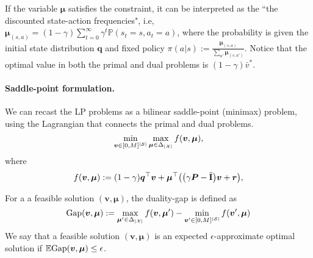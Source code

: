 \documentclass{article}
\DeclarePairedDelimiter\br{(}{)}%
\DeclarePairedDelimiter\brs{[}{]}%
\DeclarePairedDelimiter\abs{\lvert}{\rvert}%
\newcommand{\ntext}[1]{{\text{\normalfont#1}}}
\DeclareMathOperator{\Tr}{Tr}
\newcommand{\Prob}{\mathbb{P}}
\newcommand{\R}{\mathbb{R}}
\newcommand{\E}{\mathbb{E}}
\newcommand{\States}{\mathcal{S}}
\newcommand{\Actions}{\mathcal{A}}
\newcommand{\nSt}{{\abs{\States}}}
\newcommand{\nAct}{{\abs{\Actions}}}
\newcommand{\nPairs}{{\abs{\mathcal{X}}}}
\newcommand{\Pb}{\boldsymbol{P}}
\newcommand{\rb}{\boldsymbol{r}}
\newcommand{\vb}{\boldsymbol{v}}
\newcommand{\mub}{\boldsymbol{\mu}}
\newcommand{\vbar}{\bar{v}}
\newcommand{\vMax}{M}
\newcommand{\onesVec}{\mathbf{1}}
\newcommand{\Ibt}{\tilde{\textbf{I}}}
\newcommand{\Ib}{\boldsymbol{I}}
\newcommand{\initDist}{\boldsymbol{q}}
\newcommand{\vecop}{\ntext{vec}}
\newcommand{\Gap}{\ntext{Gap}}
\begin{document}



If the variable $\mub$ satisfies the constraint, it can be interpreted as the ``the discounted state-action frequencies", i.e,   $\mub_{(s,a)} = (1-\gamma) \sum_{t=0}^{\infty} \gamma^t \Prob(s_t=s,a_t=a)$, where the probability is given the initial state distribution $\initDist$ and fixed policy $\pi(a|s) := \frac{\mub_{(s,a)}}{\sum_{a'} \mub_{(s,a')}}$.
Notice that the optimal value in both the primal and dual problems is $(1-\gamma)\vbar^*$.


\paragraph{Saddle-point formulation.}
We can recast the LP problems as a bilinear saddle-point (minimax) problem, using the Lagrangian that connects the primal and dual problems.
\begin{equation} \label{eq:minimax}
    \min_{\vb \in [0,\vMax]^{\nSt}}  \max_{\mub \in \Delta_{\nPairs}} f(\vb, \mub),
\end{equation}
where 
\begin{equation} \label{eq:minimax_obj}
    f(\vb, \mub) := (1-\gamma) \initDist^\top \vb +  \mub^\top \br*{ \br*{\gamma \Pb - \Ibt} \vb +\rb},
\end{equation}

For a a feasible solution $(\vb,\mub)$, the duality-gap is defined as 
\begin{equation}
\Gap(\vb,\mub):= \max_{\mub' \in \Delta_{\nPairs}} f(\vb, \mub') -  \min_{\vb' \in [0,\vMax]^{\nSt}} f(\vb', \mub)
\end{equation}
We say that a feasible solution $(\vb,\mub)$ is an expected $\epsilon$-approximate optimal solution if $\E \Gap(\vb,\mub) \leq \epsilon$.
\end{document}
